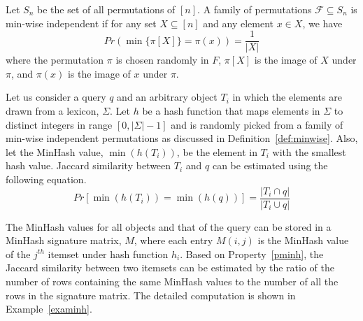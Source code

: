 \begin{definition}\label{def:minwise}
Let $S_n$ be the set of all permutations of $[n]$. A family of permutations $\mathcal{F} \subseteq S_n$ is min-wise independent if for any set $X \subseteq [n]$ and any element $x \in X$, we have
$$Pr(\min\{\pi[X]\} = \pi(x)) = \frac{1}{|X|}$$
where the permutation $\pi$ is chosen randomly in $F$, $\pi[X]$ is the image of $X$ under $\pi$, and $\pi(x)$ is the image of $x$ under $\pi$.
\end{definition}

\begin{property}
\label{pminh}
Let us consider a query $q$ and an arbitrary object $T_i$ in which the elements are drawn from a lexicon, $\Sigma$. Let $h$ be a hash function that maps elements in $\Sigma$ to distinct integers in range $[0, |\Sigma|-1]$ and is randomly picked from a family of min-wise independent permutations as discussed in Definition~\ref{def:minwise}. Also, let the MinHash value, $\min(h(T_i))$, be the element in $T_i$ with the smallest hash value. Jaccard similarity between $T_i$ and $q$ can be estimated using the following equation.           
$$Pr[\min(h(T_i))=\min(h(q))]=\frac{|T_i \cap q|}{|T_i \cup q|}$$ 
\end{property}



The MinHash values for all objects and that of the query can be stored in a MinHash signature matrix, $M$, where each entry $M(i, j)$ is the MinHash value of the $j^{th}$ itemset under hash function $h_i$. Based on Property~\ref{pminh}, the Jaccard similarity between two itemsets can be estimated by the ratio of the number of rows containing the same MinHash values to the number of all the rows in the signature matrix. The detailed computation is shown in Example~\ref{examinh}.



